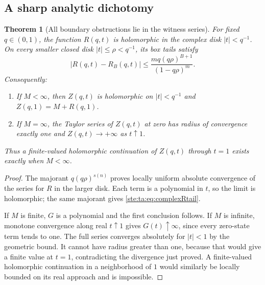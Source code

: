\documentclass[11pt,letterpaper]{article}
\newtheorem{theorem}{Theorem}[section]
\theoremstyle{definition}
\theoremstyle{remark}
\newcommand{\abs}[1]{\left\lvert #1\right\rvert}
\begin{document}
\subsection{A sharp analytic dichotomy}
\begin{theorem}[All boundary obstructions lie in the witness series]\label{ste:ta:thm:analytic}
For fixed $q\in(0,1)$, the function $R(q,t)$ is holomorphic in the complex disk $\abs t<q^{-1}$. On every smaller closed disk $\abs t\le\rho<q^{-1}$, its box tails satisfy
\begin{equation}\label{ste:ta:eq:complexRtail}
\abs{R(q,t)-R_B(q,t)}\le
\frac{m q(q\rho)^{B+1}}{(1-q\rho)^m}.
\end{equation}
Consequently:
\begin{enumerate}[label=(\roman*),itemsep=1pt]
\item If $M<\infty$, then $Z(q,t)$ is holomorphic on $\abs t<q^{-1}$ and $Z(q,1)=M+R(q,1)$.
\item If $M=\infty$, the Taylor series of $Z(q,t)$ at zero has radius of convergence exactly one and $Z(q,t)\to+\infty$ as $t\uparrow1$.
\end{enumerate}
Thus a finite-valued holomorphic continuation of $Z(q,t)$ through $t=1$ exists exactly when $M<\infty$.
\end{theorem}
\begin{proof}
The majorant $q(q\rho)^{s(n)}$ proves locally uniform absolute convergence of the series for $R$ in the larger disk. Each term is a polynomial in $t$, so the limit is holomorphic; the same majorant gives \eqref{ste:ta:eq:complexRtail}.

If $M$ is finite, $G$ is a polynomial and the first conclusion follows. If $M$ is infinite, monotone convergence along real $t\uparrow1$ gives $G(t)\uparrow\infty$, since every zero-state term tends to one. The full series converges absolutely for $\abs t<1$ by the geometric bound. It cannot have radius greater than one, because that would give a finite value at $t=1$, contradicting the divergence just proved. A finite-valued holomorphic continuation in a neighborhood of $1$ would similarly be locally bounded on its real approach and is impossible.
\end{proof}
\end{document}
